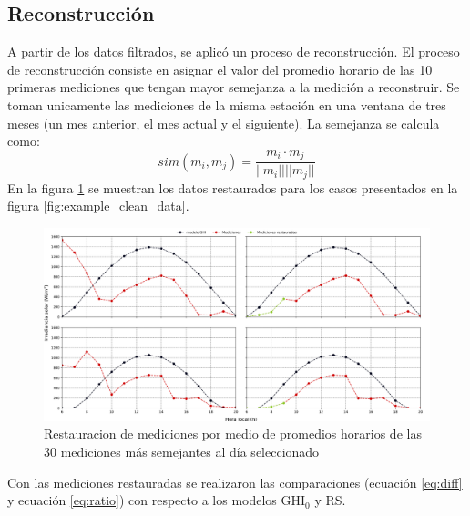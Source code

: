 \subsection{Reconstrucción}
A partir de los datos filtrados, se aplicó un proceso de reconstrucción. El proceso de reconstrucción consiste en asignar el valor del promedio horario de las 10 primeras mediciones que tengan mayor semejanza a la medición a reconstruir. Se toman unicamente las mediciones de la misma estación en una ventana de tres meses (un mes anterior, el mes actual y el siguiente). La semejanza se calcula como:
\begin{equation}
	sim(m_i , m_j ) = \frac{m_i \cdot m_j}{||m_i|| ||m_j||}
	\label{eq:cosine}
\end{equation}
En la figura \ref{fig:restoration} se muestran los datos restaurados para los casos presentados en la figura \ref{fig:example_clean_data}.
\begin{figure}[H]
	\centering
	\includegraphics[width=12cm]{Graphics/example_restoration.png}
	\caption{Restauracion de mediciones por medio de promedios horarios de las 30 mediciones más semejantes al día seleccionado}
	\label{fig:restoration}
\end{figure}
Con las mediciones restauradas se realizaron las comparaciones (ecuación \ref{eq:diff} y ecuación \ref{eq:ratio}) con respecto a los modelos GHI$_0$ y RS.
